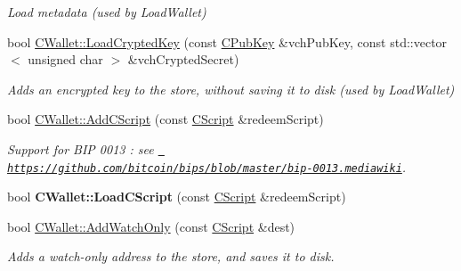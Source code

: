 \begin{DoxyCompactItemize}
\begin{DoxyCompactList}\small\item\em Load metadata (used by Load\+Wallet) \end{DoxyCompactList}\item 
\mbox{\label{group__map_wallet_ga01fbd78238d4ef833d059f12a7e8ac9f}} 
bool \mbox{\hyperlink{group__map_wallet_ga01fbd78238d4ef833d059f12a7e8ac9f}{C\+Wallet\+::\+Load\+Crypted\+Key}} (const \mbox{\hyperlink{class_c_pub_key}{C\+Pub\+Key}} \&vch\+Pub\+Key, const std\+::vector$<$ unsigned char $>$ \&vch\+Crypted\+Secret)
\begin{DoxyCompactList}\small\item\em Adds an encrypted key to the store, without saving it to disk (used by Load\+Wallet) \end{DoxyCompactList}\item 
\mbox{\label{group__map_wallet_gad7edacad1c926bc4b7fe0dc1be95ce31}} 
bool \mbox{\hyperlink{group__map_wallet_gad7edacad1c926bc4b7fe0dc1be95ce31}{C\+Wallet\+::\+Add\+C\+Script}} (const \mbox{\hyperlink{class_c_script}{C\+Script}} \&redeem\+Script)
\begin{DoxyCompactList}\small\item\em Support for B\+IP 0013 \+: see \href{https://github.com/bitcoin/bips/blob/master/bip-0013.mediawiki}{\texttt{ https\+://github.\+com/bitcoin/bips/blob/master/bip-\/0013.\+mediawiki}}. \end{DoxyCompactList}\item 
\mbox{\label{group__map_wallet_gadbf0abef9da8102f000d4afd5cec5bbc}} 
bool {\bfseries C\+Wallet\+::\+Load\+C\+Script} (const \mbox{\hyperlink{class_c_script}{C\+Script}} \&redeem\+Script)
\item 
\mbox{\label{group__map_wallet_ga022f12d5f56bbe831136388e2ac19969}} 
bool \mbox{\hyperlink{group__map_wallet_ga022f12d5f56bbe831136388e2ac19969}{C\+Wallet\+::\+Add\+Watch\+Only}} (const \mbox{\hyperlink{class_c_script}{C\+Script}} \&dest)
\begin{DoxyCompactList}\small\item\em Adds a watch-\/only address to the store, and saves it to disk. \end{DoxyCompactList}\item 
\mbox{\label{group__map_wallet_ga5be12b9afcf63079b8c009038843b5a2}} 

\end{DoxyCompactItemize}
